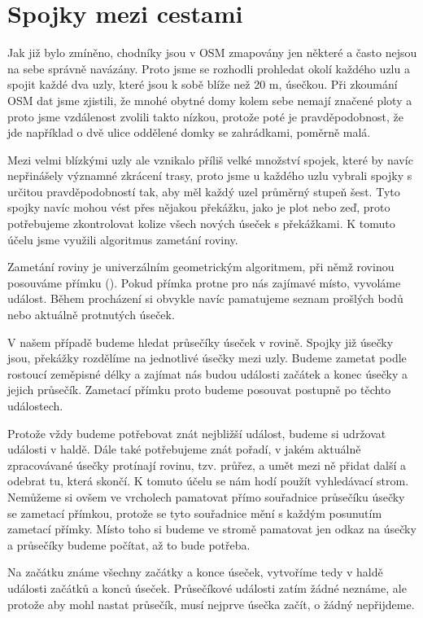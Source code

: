 \section{Spojky mezi cestami}
Jak již bylo zmíněno, chodníky jsou v OSM zmapovány jen některé a často nejsou
na sebe správně navázány. Proto jsme se rozhodli prohledat okolí každého uzlu a
spojit každé dva uzly, které jsou k sobě blíže než 20 m, úsečkou. Při zkoumání
OSM dat jsme zjistili, že mnohé obytné domy kolem sebe nemají značené ploty a
proto jsme vzdálenost zvolili takto nízkou, protože poté je pravděpodobnost, že
jde například o dvě ulice oddělené domky se zahrádkami, poměrně malá.  

Mezi velmi blízkými uzly ale vznikalo příliš velké množství spojek, které by
navíc nepřinášely významné zkrácení trasy, proto jsme u každého uzlu vybrali
spojky s určitou pravděpodobností tak, aby měl každý uzel průměrný stupeň šest.
Tyto spojky navíc mohou vést přes nějakou překážku, jako je plot nebo zeď, proto
potřebujeme zkontrolovat kolize všech nových úseček s překážkami. K tomuto účelu
jsme využili algoritmus zametání roviny.

Zametání roviny\cite{zametani} je univerzálním geometrickým algoritmem, při němž
rovinou posouváme přímku (). Pokud přímka protne pro nás zajímavé
místo, vyvoláme událost. Během procházení si obvykle navíc pamatujeme seznam
prošlých bodů nebo aktuálně protnutých úseček.

V našem případě budeme hledat průsečíky úseček v rovině. Spojky již úsečky jsou,
překážky rozdělíme na jednotlivé úsečky mezi uzly. Budeme zametat podle rostoucí
zeměpisné délky a zajímat nás budou události začátek a konec úsečky a jejich
průsečík. Zametací přímku proto budeme posouvat postupně po těchto událostech.

Protože vždy budeme potřebovat znát nejbližší událost, budeme si udržovat
události v haldě. Dále také potřebujeme znát pořadí, v jakém aktuálně
zpracovávané úsečky protínají rovinu, tzv. průřez, a umět mezi ně přidat další a
odebrat tu, která skončí. K tomuto účelu se nám hodí použít vyhledávací strom.
Nemůžeme si ovšem ve vrcholech pamatovat přímo souřadnice průsečíku úsečky se
zametací přímkou, protože se tyto souřadnice mění s každým posunutím zametací
přímky. Místo toho si budeme ve stromě pamatovat jen odkaz na úsečky a průsečíky
budeme počítat, až to bude potřeba.

Na začátku známe všechny začátky a konce úseček, vytvoříme tedy v haldě události
začátků a konců úseček. Průsečíkové události zatím žádné neznáme, ale protože
aby mohl nastat průsečík, musí nejprve úsečka začít, o žádný nepřijdeme. 

